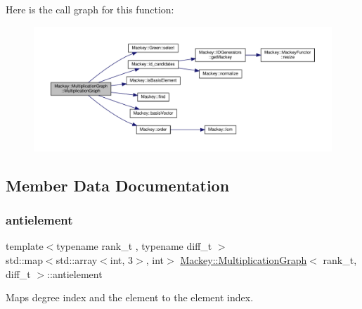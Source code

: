 Here is the call graph for this function\+:\nopagebreak
\begin{figure}[H]
\begin{center}
\leavevmode
\includegraphics[width=350pt]{classMackey_1_1MultiplicationGraph_a3f974791242d9e13ddca520df4265aca_cgraph}
\end{center}
\end{figure}


\subsection{Member Data Documentation}
\mbox{\label{classMackey_1_1MultiplicationGraph_ad0736e72169b51d410d5b61b0f921241}} 
\subsubsection{\texorpdfstring{antielement}{antielement}}
{\footnotesize\ttfamily template$<$typename rank\+\_\+t , typename diff\+\_\+t $>$ \\
std\+::map$<$std\+::array$<$int, 3$>$, int$>$ \hyperlink{classMackey_1_1MultiplicationGraph}{Mackey\+::\+Multiplication\+Graph}$<$ rank\+\_\+t, diff\+\_\+t $>$\+::antielement\hspace{0.3cm}{\ttfamily [protected]}}



Maps degree index and the element to the element index. 

\mbox{\label{classMackey_1_1MultiplicationGraph_aa0eb04947f664262233ed4cdf650371b}} 
